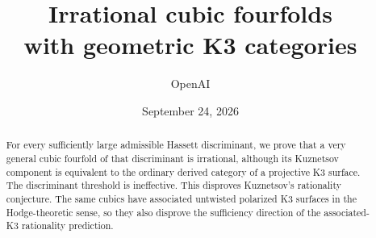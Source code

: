 \documentclass[11pt]{article}
\title{Irrational cubic fourfolds\\with geometric K3 categories}
\author{OpenAI}
\date{September 24, 2026}
\numberwithin{equation}{section}
\theoremstyle{definition}
\theoremstyle{remark}
\begin{document}
\maketitle
\begin{abstract}
For every sufficiently large admissible Hassett discriminant, we prove that
a very general cubic fourfold of that discriminant is irrational, although
its Kuznetsov component is equivalent to the ordinary derived category of a
projective K3 surface. The discriminant threshold is ineffective.
This disproves Kuznetsov's rationality conjecture.
The same cubics have associated untwisted polarized K3 surfaces in the
Hodge-theoretic sense, so they also disprove the sufficiency direction of
the associated-K3 rationality prediction.
\end{abstract}
\setcounter{tocdepth}{1}
\tableofcontents








\begingroup
\raggedright

\endgroup
\end{document}
